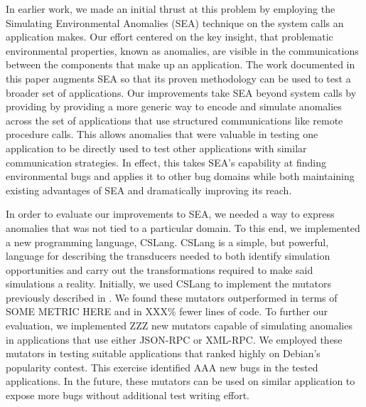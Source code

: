 

In earlier work, we made an initial thrust at this problem by employing the
Simulating Environmental Anomalies (SEA) technique on the system calls an
application makes. Our effort centered on the key insight, that problematic
environmental properties, known as anomalies, are visible in the
communications between the components that make up an application.  The
work documented in this paper augments SEA so that its proven methodology
can be used to test a broader set of applications.  Our improvements take
SEA beyond system calls by providing by providing a more generic way to
encode and simulate anomalies across the set of applications that use
structured communications like remote procedure calls.
This allows anomalies that were
valuable in testing one application to be directly used to test other
applications with similar communication strategies.  In effect, this takes
SEA's capability at finding environmental bugs and applies it to other bug
domains while both maintaining existing advantages of SEA and
dramatically improving its reach.




In order to evaluate our improvements to SEA, we needed a way to express
anomalies that was not tied to a particular domain.  To this end, we
implemented a new programming language, CSLang.  CSLang is a simple, but
powerful, language for describing the transducers needed to both identify
simulation opportunities and carry out the transformations required to make
said simulations a reality.  Initially, we used CSLang to implement the
mutators previously described in . We found these mutators outperformed in terms of SOME METRIC HERE and
in XXX\% fewer lines of code.  To further our evaluation, we implemented ZZZ new
mutators capable of simulating anomalies in applications that use either
JSON-RPC or XML-RPC.  We employed these mutators in testing suitable
applications that ranked highly on Debian's popularity contest.  This
exercise identified AAA new bugs in the tested applications.  In the
future, these mutators can be used on similar application to expose more
bugs without additional test writing effort.

